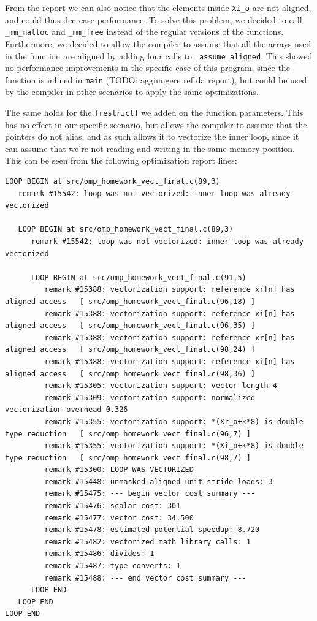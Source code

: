 \documentclass{article}
\begin{document}
From the report we can also notice that the elements inside \verb|Xi_o| are not aligned, and could thus decrease performance. To solve this problem, we decided to call \verb|_mm_malloc| and \verb|_mm_free| instead of the regular versions of the functions. Furthermore, we decided to allow the compiler to assume that all the arrays used in the function are aligned by adding four calls to \verb|_assume_aligned|. This showed no performance improvements in the specific case of this program, since the function is inlined in \verb|main| (TODO: aggiungere ref da report), but could be used by the compiler in other scenarios to apply the same optimizations.


The same holds for the \verb|[restrict]| we added on the function parameters. This has no effect in our specific scenario, but allows the compiler to assume that the pointers do not alias, and as such allows it to vectorize the inner loop, since it can assume that we're not reading and writing in the same memory position. This can be seen from the following optimization report lines:


\begin{verbatim}
LOOP BEGIN at src/omp_homework_vect_final.c(89,3)
   remark #15542: loop was not vectorized: inner loop was already vectorized

   LOOP BEGIN at src/omp_homework_vect_final.c(89,3)
      remark #15542: loop was not vectorized: inner loop was already vectorized

      LOOP BEGIN at src/omp_homework_vect_final.c(91,5)
         remark #15388: vectorization support: reference xr[n] has aligned access   [ src/omp_homework_vect_final.c(96,18) ]
         remark #15388: vectorization support: reference xi[n] has aligned access   [ src/omp_homework_vect_final.c(96,35) ]
         remark #15388: vectorization support: reference xr[n] has aligned access   [ src/omp_homework_vect_final.c(98,24) ]
         remark #15388: vectorization support: reference xi[n] has aligned access   [ src/omp_homework_vect_final.c(98,36) ]
         remark #15305: vectorization support: vector length 4
         remark #15309: vectorization support: normalized vectorization overhead 0.326
         remark #15355: vectorization support: *(Xr_o+k*8) is double type reduction   [ src/omp_homework_vect_final.c(96,7) ]
         remark #15355: vectorization support: *(Xi_o+k*8) is double type reduction   [ src/omp_homework_vect_final.c(98,7) ]
         remark #15300: LOOP WAS VECTORIZED
         remark #15448: unmasked aligned unit stride loads: 3 
         remark #15475: --- begin vector cost summary ---
         remark #15476: scalar cost: 301 
         remark #15477: vector cost: 34.500 
         remark #15478: estimated potential speedup: 8.720 
         remark #15482: vectorized math library calls: 1 
         remark #15486: divides: 1 
         remark #15487: type converts: 1 
         remark #15488: --- end vector cost summary ---
      LOOP END
   LOOP END
LOOP END
\end{verbatim}
\end{document}
